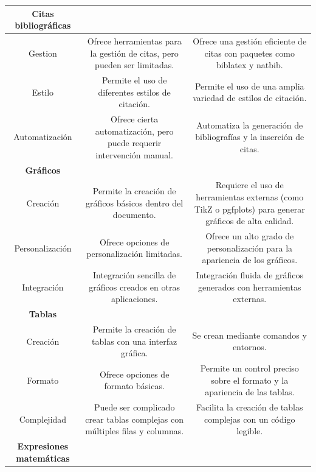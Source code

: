 \documentclass[10pt,twocolumn]{article}
\begin{document}
\begin{table}[ht!]
{\begin{tabular}{|c|c|c|}
            \rowcolor{gray!30}
            \textbf{Citas bibliográficas}         &         &                   \\ \hline
            {Gestion}         & Ofrece herramientas para la gestión de citas, pero pueden ser limitadas.          & Ofrece una gestión eficiente de citas con paquetes como biblatex y natbib.                 \\ \hline
            {Estilo}          & Permite el uso de diferentes estilos de citación.          & Permite el uso de una amplia variedad de estilos de citación.\\ \hline
            {Automatización}  & Ofrece cierta automatización, pero puede requerir intervención manual.          & Automatiza la generación de bibliografías y la inserción de citas.                \\ \hline
            \rowcolor{gray!30}
            \textbf{Gráficos}        &         &                   \\ \hline
            {Creación}        & Permite la creación de gráficos básicos dentro del documento.          & Requiere el uso de herramientas externas (como TikZ o pgfplots) para generar gráficos de alta calidad.                \\ \hline
            {Personalización} & Ofrece opciones de personalización limitadas.          & Ofrece un alto grado de personalización para la apariencia de los gráficos.\\ \hline
            {Integración}     & Integración sencilla de gráficos creados en otras aplicaciones.          & Integración fluida de gráficos generados con herramientas externas.              \\ \hline
            \rowcolor{gray!30}
            \textbf{Tablas}          &         &                   \\ \hline
            {Creación}        & Permite la creación de tablas con una interfaz gráfica.        & Se crean mediante comandos y entornos.                \\ \hline
            {Formato}         & Ofrece opciones de formato básicas.          & Permite un control preciso sobre el formato y la apariencia de las tablas.\\ \hline
            {Complejidad}     & Puede ser complicado crear tablas complejas con múltiples filas y columnas.          & Facilita la creación de tablas complejas con un código legible.              \\ \hline
            \rowcolor{gray!30}
            \textbf{Expresiones matemáticas}          &         &                   \\ \hline

\end{tabular}}
\end{table}
\end{document}
